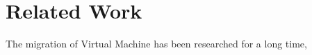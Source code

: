 \chapter{Related Work}
\label{chap:related}

The migration of Virtual Machine \cite{clark2005live} has been researched for a long time,